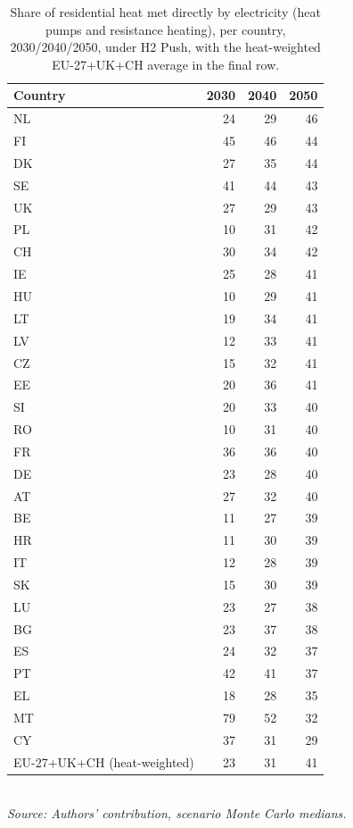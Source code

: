 \begin{table}[htbp]
\centering
\small
\caption{Share of residential heat met directly by electricity (heat pumps and resistance heating), per country, 2030/2040/2050, under H2 Push, with the heat-weighted EU-27+UK+CH average in the final row.}
\label{tab:electrified}
\begin{tabular}{lrrr}
\toprule
Country & 2030 & 2040 & 2050 \\
\midrule
NL & 24 & 29 & 46 \\
FI & 45 & 46 & 44 \\
DK & 27 & 35 & 44 \\
SE & 41 & 44 & 43 \\
UK & 27 & 29 & 43 \\
PL & 10 & 31 & 42 \\
CH & 30 & 34 & 42 \\
IE & 25 & 28 & 41 \\
HU & 10 & 29 & 41 \\
LT & 19 & 34 & 41 \\
LV & 12 & 33 & 41 \\
CZ & 15 & 32 & 41 \\
EE & 20 & 36 & 41 \\
SI & 20 & 33 & 40 \\
RO & 10 & 31 & 40 \\
FR & 36 & 36 & 40 \\
DE & 23 & 28 & 40 \\
AT & 27 & 32 & 40 \\
BE & 11 & 27 & 39 \\
HR & 11 & 30 & 39 \\
IT & 12 & 28 & 39 \\
SK & 15 & 30 & 39 \\
LU & 23 & 27 & 38 \\
BG & 23 & 37 & 38 \\
ES & 24 & 32 & 37 \\
PT & 42 & 41 & 37 \\
EL & 18 & 28 & 35 \\
MT & 79 & 52 & 32 \\
CY & 37 & 31 & 29 \\
\midrule
EU-27+UK+CH (heat-weighted) & 23 & 31 & 41 \\
\bottomrule
\end{tabular}
\\[2pt]{\footnotesize\textit{Source: Authors' contribution, scenario Monte Carlo medians.}}
\end{table}
